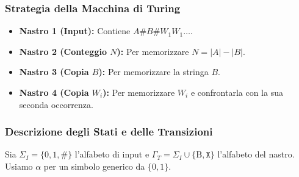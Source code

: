 \documentclass[a4paper]{article}
\newcommand{\B}{\text{B}} %
\begin{document}
\subsubsection{Strategia della Macchina di Turing}
\begin{itemize}
    \item \textbf{Nastro 1 (Input):} Contiene $A\texttt{\#}B\texttt{\#}W_1 W_1 \dots$.
    \item \textbf{Nastro 2 (Conteggio $N$):} Per memorizzare $N = |A| - |B|$.
    \item \textbf{Nastro 3 (Copia $B$):} Per memorizzare la stringa $B$.
    \item \textbf{Nastro 4 (Copia $W_i$):} Per memorizzare $W_i$ e confrontarla con la sua seconda occorrenza.
\end{itemize}

\subsubsection{Descrizione degli Stati e delle Transizioni}
Sia $\Sigma_I = \{0,1,\texttt{\#}\}$ l'alfabeto di input e $\Gamma_T = \Sigma_I \cup \{\B, \texttt{X}\}$ l'alfabeto del nastro. Usiamo $\alpha$ per un simbolo generico da $\{0,1\}$.
\end{document}
